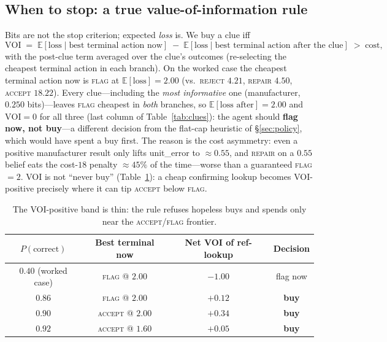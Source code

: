 \documentclass[11pt]{article}
\newcommand{\pcorrect}{P(\text{correct})}
\begin{document}
\subsection{When to stop: a true value-of-information rule}
Bits are not the stop criterion; expected \emph{loss} is. We buy a clue iff
\[
\text{VOI} \;=\; \mathbb{E}[\text{loss}\mid \text{best terminal action now}]
\;-\; \mathbb{E}[\text{loss}\mid \text{best terminal action after the clue}]
\;>\; \text{cost},
\]
with the post-clue term averaged over the clue's outcomes (re-selecting the cheapest
terminal action in each branch). On the worked case the cheapest terminal action now
is \textsc{flag} at $\mathbb{E}[\text{loss}]=2.00$ (vs.\ \textsc{reject} $4.21$,
\textsc{repair} $4.50$, \textsc{accept} $18.22$). Every clue---including the
\emph{most informative} one (manufacturer, $0.250$ bits)---leaves \textsc{flag}
cheapest in \emph{both} branches, so $\mathbb{E}[\text{loss after}]=2.00$ and
$\text{VOI}=0$ for all three (last column of Table~\ref{tab:clues}): the agent should
\textbf{flag now, not buy}---a different decision from the flat-cap heuristic of
\S\ref{sec:policy}, which would have spent a buy first. The reason is the cost
asymmetry: even a positive manufacturer result only lifts \textsf{unit\_error} to
$\approx0.55$, and \textsc{repair} on a $0.55$ belief eats the cost-$18$ penalty
$\approx45\%$ of the time---worse than a guaranteed \textsc{flag}$=2$. VOI is not
``never buy'' (Table~\ref{tab:voi}): a cheap confirming lookup becomes VOI-positive
precisely where it can tip \textsc{accept} below \textsc{flag}.

\begin{table}[h]\centering\small
\caption{The VOI-positive band is thin: the rule refuses hopeless buys and spends only
near the \textsc{accept}/\textsc{flag} frontier.}
\label{tab:voi}
\begin{tabular}{cccc}
\toprule
$\pcorrect$ & Best terminal now & Net VOI of ref-lookup & Decision\\
\midrule
$0.40$ (worked case) & \textsc{flag} @ $2.00$ & $-1.00$ & flag now\\
$0.86$ & \textsc{flag} @ $2.00$ & $+0.12$ & \textbf{buy}\\
$0.90$ & \textsc{accept} @ $2.00$ & $+0.34$ & \textbf{buy}\\
$0.92$ & \textsc{accept} @ $1.60$ & $+0.05$ & \textbf{buy}\\
\bottomrule
\end{tabular}
\end{table}
\end{document}
